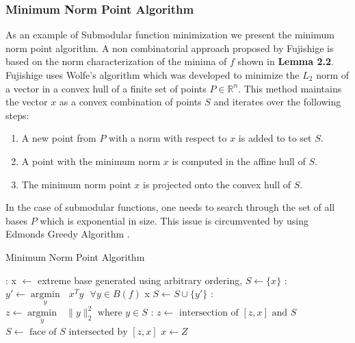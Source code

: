 \subsubsection{Minimum Norm Point Algorithm}
As an example of Submodular function minimization we present the minimum norm point algorithm. A non combinatorial approach proposed by Fujishige \cite{Fujishige} is based on the norm characterization of the minima of $f$ shown in {\bf Lemma 2.2}. Fujishige uses Wolfe's algorithm \cite{Wolfe} which was developed to minimize the $L_2$ norm of a vector in a convex hull of a finite set of points $P \in \mathds{R}^n$. This method maintains the vector $x$ as a convex combination of points $S$ and iterates over the following steps:
\begin{enumerate}
\item A new point from $P$ with a norm with respect to $x$ is added to to set $S$.
\item A point with the minimum norm $x$ is computed in the affine hull of $S$.
\item The minimum norm point $x$ is projected onto the convex hull of $S$. 
\end{enumerate}

In the case of submodular functions, one needs to search through the set of all bases $P$ which is exponential in size. This issue is circumvented by using Edmonds Greedy Algorithm \cite{Edmond}.

\begin{algorithm}[htb]
\caption{Minimum Norm Point Algorithm}
\label{alg:min_norm_point}
\begin{algorithmic}[1]
\footnotesize
{}: x $\leftarrow$ extreme base generated using arbitrary ordering, $S \leftarrow \{x\}$
\Loop
  : $y' \leftarrow  \underset{y}{\operatorname{argmin }}\text{ } x^Ty \text{ } \forall y\in B(f)$
 x
\Else
$S \leftarrow S \cup \{y'\}$
\EndIf
{}: $z \leftarrow  \underset{y}{\operatorname{argmin }}\text{ } {\|y\|_2^2 \text{ where } y\in S}$
: 
               \State $z \leftarrow \text{ intersection of } [z,x] \text{ and } S$
		\State $S \leftarrow \text{ face of $S$ intersected by } [z,x]$
\EndWhile
\State $x\leftarrow Z$
\EndLoop
\end{algorithmic}
\end{algorithm}